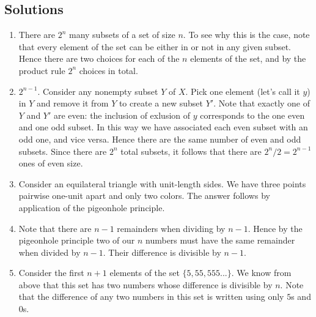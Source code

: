 \newpage
\begin{mdframed}[linewidth=1]
\section*{Solutions}
\begin{enumerate}
    \item There are $2^n$ many subsets of a set of size $n$. To see why this is the case, note that every element of the set can be either in or not in any given subset. Hence there are two choices for each of the $n$ elements of the set, and by the product rule $2^n$ choices in total. 

    \item $2^{n-1}$. Consider any nonempty subset $Y$ of $X$. Pick one element (let's call it $y$) in $Y$ and remove it from $Y$ to create a new subset $Y'$. Note that exactly one of $Y$ and $Y'$ are even: the inclusion of exlusion of $y$ corresponds to the one even and one odd subset. In this way we have associated each even subset with an odd one, and vice versa. Hence there are the same number of even and odd subsets. Since there are $2^n$ total subsets, it follows that there are $2^n/2 = 2^{n-1}$ ones of even size. 

    \item Consider an equilateral triangle with unit-length sides. We have three points pairwise one-unit apart and only two colors. The answer follows by application of the pigeonhole principle. 

    \item Note that there are $n - 1$ remainders when dividing by $n - 1$. Hence by the pigeonhole principle two of our $n$ numbers must have the same remainder when divided by $n - 1$. Their difference is divisible by $n - 1$. 

    \item Consider the first $n + 1$ elements of the set $\{5, 55, 555...\}$. We know from above that this set has two numbers whose difference is divisible by $n$. Note that the difference of any two numbers in this set is written using only $5$s and $0$s.

\end{enumerate}
\end{mdframed}
\newpage